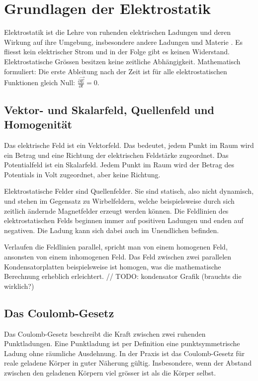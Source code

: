 \section{Grundlagen der Elektrostatik\label{elektro:section:EFeld}}

Elektrostatik ist die Lehre von ruhenden elektrischen Ladungen und deren Wirkung auf ihre Umgebung, insbesondere andere Ladungen und Materie \cite{elektro:elt2_skript}.
Es fliesst kein elektrischer Strom und in der Folge gibt es keinen Widerstand. 
Elektrostatische Grössen besitzen keine zeitliche Abhängigkeit.
Mathematisch formuliert: Die erste Ableitung nach der Zeit ist für alle elektrostatischen Funktionen gleich Null: $\frac{\partial \vec{E}}{\partial t} = 0$.

\subsection{Vektor- und Skalarfeld, Quellenfeld und Homogenität
\label{elektro:subsection:VektorSkalar}}
Das elektrische Feld ist ein Vektorfeld.
Das bedeutet, jedem Punkt im Raum wird ein Betrag und eine Richtung der elektrischen Feldstärke zugeordnet. 
Das Potentialfeld ist ein Skalarfeld.
Jedem Punkt im Raum wird der Betrag des Potentials in Volt zugeordnet, aber keine Richtung.

Elektrostatische Felder sind Quellenfelder.
Sie sind statisch, also nicht dynamisch, und stehen im Gegensatz zu Wirbelfeldern, welche beispielsweise durch sich zeitlich ändernde Magnetfelder erzeugt werden können.
Die Feldlinien des elektrostatischen Felds beginnen immer auf positiven Ladungen und enden auf negativen. 
Die Ladung kann sich dabei auch im Unendlichen befinden.


Verlaufen die Feldlinien parallel, spricht man von einem homogenen Feld, ansonsten von einem inhomogenen Feld.
Das Feld zwischen zwei parallelen Kondensatorplatten beispielsweise ist homogen, was die mathematische Berechnung erheblich erleichtert. 
// TODO: kondensator Grafik (brauchts die wirklich?)

\subsection{Das Coulomb-Gesetz
\label{elektro:subsection:Coulomb}}
Das Coulomb-Gesetz beschreibt die Kraft zwischen zwei ruhenden Punktladungen.
Eine Punktladung ist per Definition eine punktsymmetrische Ladung ohne  räumliche Ausdehnung.
In der Praxis ist das Coulomb-Gesetz für reale geladene Körper in guter Näherung gültig.
Insbesondere, wenn der Abstand zwischen den geladenen Körpern viel grösser ist als die Körper selbst.

